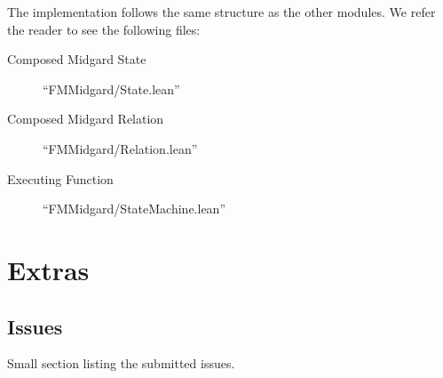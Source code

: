 The implementation follows the same structure as the other modules.
%
We refer the reader to see the following files:
\begin{description}
\item[Composed Midgard State] ``FMMidgard/State.lean''
\item[Composed Midgard Relation] ``FMMidgard/Relation.lean''
\item[Executing Function]``FMMidgard/StateMachine.lean''
  \end{description}

\chapter{Extras}
\section{Issues}
\label{sec:Issues}

Small section listing the submitted issues.

